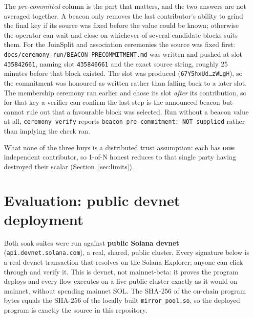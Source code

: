 \documentclass[10pt]{article}
\newcommand{\code}[1]{\texttt{#1}}
\begin{document}
The \emph{pre-committed} column is the part that matters, and the two answers are
not averaged together. A beacon only removes the last contributor's ability to
grind the final key if its source was fixed before the value could be known;
otherwise the operator can wait and close on whichever of several candidate blocks
suits them. For the JoinSplit and association ceremonies the source was fixed
first: \code{docs/ceremony-run/BEACON-PRECOMMITMENT.md} was written and pushed at
slot \code{435842661}, naming slot \code{435846661} and the exact source string,
roughly 25 minutes before that block existed. The slot was produced
(\code{67Y5hxUd\ldots zWLgH}), so the commitment was honoured as written rather than
falling back to a later slot. The membership ceremony ran earlier and chose its
slot \emph{after} its contribution, so for that key a verifier can confirm the last
step is the announced beacon but cannot rule out that a favourable block was
selected. Run without a beacon value at all, \code{ceremony verify} reports
\code{beacon pre-commitment: NOT supplied} rather than implying the check ran.

What none of the three buys is a distributed trust assumption: each has
\textbf{one} independent contributor, so 1-of-N honest reduces to that single party
having destroyed their scalar (Section~\ref{sec:limits}).

\section{Evaluation: public devnet deployment}
\label{sec:eval}

Both soak suites were run against \textbf{public Solana devnet}
(\code{api.devnet.solana.com}), a real, shared, public cluster. Every signature
below is a real devnet transaction that resolves on the Solana Explorer; anyone
can click through and verify it. This is devnet, not mainnet-beta: it proves the
program deploys and every flow executes on a live public cluster exactly as it
would on mainnet, without spending mainnet SOL. The SHA-256 of the on-chain
program bytes equals the SHA-256 of the locally built \code{mirror\_pool.so}, so
the deployed program is exactly the source in this repository.
\end{document}
